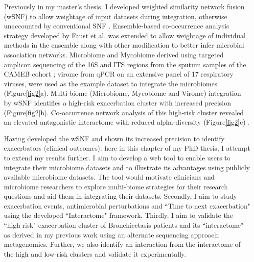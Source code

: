 Previously in my master's thesis, I developed weighted similarity network fusion (wSNF) to allow weightage of input datasets during integration, otherwise unaccounted by conventional SNF \cite{Wang2014}. Ensemble-based co-occurrence analysis strategy developed by Faust et al. \cite{Faust2012} was extended to allow weightage of individual methods in the ensemble along with other modification to better infer microbial association networks. Microbiome and Mycobiome derived using targeted amplicon sequencing of the 16S and ITS regions from the sputum samples of the CAMEB cohort \cite{Mac1800766}; virome from qPCR on an extensive panel of 17 respiratory viruses, were used as the example dataset to integrate the microbiomes (Figure\ref{fig2}a). Multi-biome (Microbiome, Mycobiome and Virome) integration by wSNF identifies a high-risk exacerbation cluster with increased precision (Figure\ref{fig2}b). Co-occurrence network analysis of this high-risk cluster revealed an elevated antagonistic interactome with reduced alpha-diversity (Figure\ref{fig2}c) \cite{Narayana2019}.

Having developed the wSNF and shown its increased precision to identify exacerbators (clinical outcomes); here in this chapter of my PhD thesis, I attempt to extend my results further. I aim to develop a web tool to enable users to integrate their microbiome datasets and to illustrate its advantages using publicly available microbiome datasets. The tool would motivate clinicians and microbiome researchers to explore multi-biome strategies for their research questions and aid them in integrating their datasets. Secondly, I aim to study exacerbation events, antimicrobial perturbations and ``Time to next exacerbation" using the developed ``Interactome" framework. Thirdly, I aim to validate the ``high-risk" exacerbation cluster of Bronchiectasis patients and its ``interactome" as derived in my previous work \cite{Narayana2019} using an alternate sequencing approach: metagenomics. Further, we also identify an interaction from the interactome of the high and low-risk clusters and validate it experimentally. 